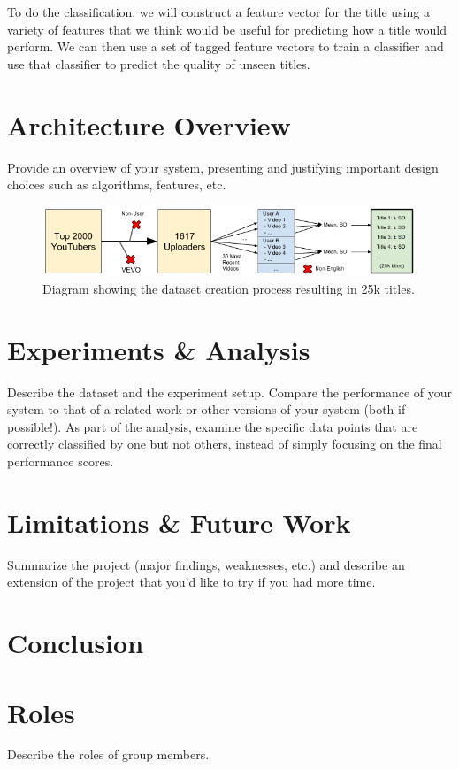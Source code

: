 \documentclass[a4paper,12pt]{article}
\begin{document}
To do the classification, we will construct a feature vector for the title using a variety of features that we think would be useful for predicting how a title would perform. We can then use a set of tagged feature vectors to train a classifier and use that classifier to predict the quality of unseen titles.

\section{Architecture Overview}
Provide an overview of your system, presenting and justifying important design
choices such as algorithms, features, etc.

\begin{figure}[h]
    \centering
    \includegraphics[width=.99\textwidth]{dataset}
    \caption{Diagram showing the dataset creation process resulting in 25k titles.}
    \label{fig:dataset}
\end{figure}


\section{Experiments \& Analysis}
Describe the dataset and the experiment setup. Compare the
performance of your system to that of a related work or other versions of your system (both if
possible!). As part of the analysis, examine the specific data points that are correctly classified by
one but not others, instead of simply focusing on the final performance scores.

\section{Limitations \& Future Work}
Summarize the project (major findings, weaknesses, etc.) and describe an extension
of the project that you’d like to try if you had more time.

\section{Conclusion}




\appendix
\section{Roles}
Describe the roles of group members.
\end{document}
